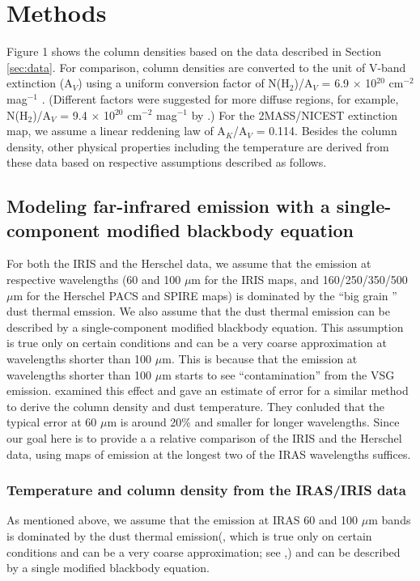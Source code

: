 \documentclass[11pt,a4paper]{emulateapj}
\begin{document}
\section{Methods}
\label{sec:methods}
Figure 1 shows the column densities based on the data described in Section \ref{sec:data}. For comparison, column densities are converted to the unit of V-band extinction (A$_V$) using a uniform conversion factor of N(H$_2$)/A$_V$ = 6.9 $\times$ 10$^{20}$ cm$^{-2}$ mag$^{-1}$ \citep{Draine_2003,Evans_2009}. (Different factors were suggested for more diffuse regions, for example, N(H$_2$)/A$_V$ = 9.4 $\times$ 10$^{20}$ cm$^{-2}$ mag$^{-1}$ by \citet{Bohlin_1978}.) For the 2MASS/NICEST extinction map, we assume a linear reddening law of A$_K$/A$_V$ = 0.114. Besides the column density, other physical properties including the temperature are derived from these data based on respective assumptions described as follows.

\subsection{Modeling far-infrared emission with a single-component modified blackbody equation}
For both the IRIS and the Herschel data, we assume that the emission at respective wavelengths (60 and 100 $\mu$m for the IRIS maps, and 160/250/350/500 $\mu$m for the Herschel PACS and SPIRE maps) is dominated by the ``big grain \citep[BG;]{Stepnik_2003}'' dust thermal emssion. We also assume that the dust thermal emission can be described by a single-component modified blackbody equation. This assumption is true only on certain conditions and can be a very coarse approximation at wavelengths shorter than 100 $\mu$m. This is because that the emission at wavelengths shorter than 100 $\mu$m starts to see ``contamination'' from the VSG emission. \citet{Schnee_2007} examined this effect and gave an estimate of error for a similar method to derive the column density and dust temperature. They conluded that the typical error at 60 $\mu$m is around 20\% and smaller for longer wavelengths. Since our goal here is to provide a a relative comparison of the IRIS and the Herschel data, using maps of emission at the longest two of the IRAS wavelengths suffices.

\subsubsection{Temperature and column density from the IRAS/IRIS data}
As mentioned above, we assume that the emission at IRAS 60 and 100 $\mu$m bands is dominated by the dust thermal emission(, which is true only on certain conditions and can be a very coarse approximation; see \citet{Schnee_2007},) and can be described by a single modified blackbody equation. 
\end{document}
